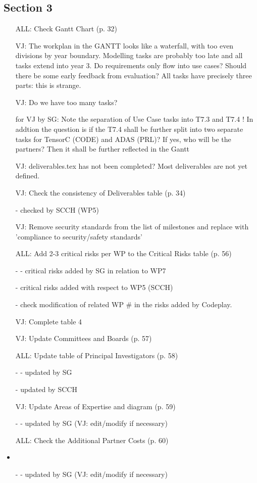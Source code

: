 \subsection*{Section 3}
\begin{itemize}
\item[ALL:]
Check Gantt Chart (p. 32)
\item[VJ:]
The  workplan in the GANTT looks like a waterfall, with too even divisions by year boundary.  Modelling tasks are probably
too late and all tasks extend into year 3.  Do requirements only flow into use cases? Should there be some early feedback
from evaluation?  All tasks have precisely three parts: this is strange.
\item[VJ:]
Do we have too many tasks?
\item[for VJ by SG:] Note the separation of Use Case tasks into T7.3 and T7.4 ! In addtion the question is if the T7.4 shall be further split into two separate tasks for TensorC (CODE) and ADAS (PRL)? If yes, who  will be the partners? Then it shall be further reflected in the Gantt   
\item[VJ:]
deliverables.tex has not been completed?  Most deliverables are not yet defined.
\item[VJ:]
Check the consistency of Deliverables table (p. 34)
\item[-] checked by SCCH (WP5)
\item[VJ:]
Remove security standards from the list of milestones and replace with 'compliance to security/safety standards'
\item[ALL:]
Add 2-3 critical risks per WP to the Critical Risks table (p. 56)
\item[-] - critical risks added by SG in relation to WP7 
\item[-] critical risks added with respect to WP5 (SCCH)
\item[-] check modification of related WP \# in the risks added by Codeplay.
\item[VJ:]
Complete table 4
\item[VJ:]
Update Committees and Boards (p. 57)
\item[ALL:]
Update table of Principal Investigators (p. 58)
\item[-] - updated by SG 
\item[-] updated by SCCH
\item[VJ:]
Update Areas of Expertise and diagram (p. 59)
\item[-] - updated by SG (VJ: edit/modify if necessary)
\item[ALL:]
Check the Additional Partner Costs (p. 60)
\item \item[-] - updated by SG (VJ: edit/modify if necessary)
\end{itemize}




